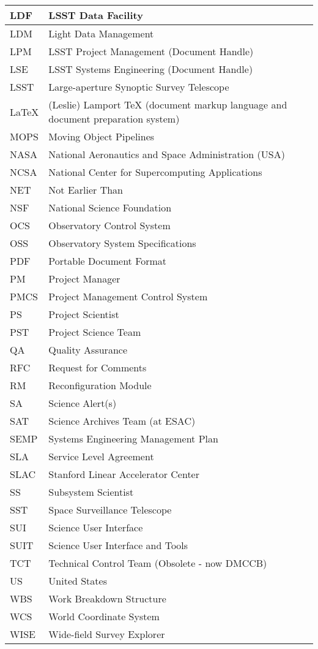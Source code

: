 \begin{longtable}{|l|p{}|}
LDF&LSST Data Facility \\\hline
LDM&Light Data Management \\\hline
LPM&LSST Project Management (Document Handle) \\\hline
LSE&LSST Systems Engineering (Document Handle) \\\hline
LSST&Large-aperture Synoptic Survey Telescope \\\hline
LaTeX&(Leslie) Lamport TeX (document markup language and document preparation system) \\\hline
MOPS&Moving Object Pipelines \\\hline
NASA&National Aeronautics and Space Administration (USA) \\\hline
NCSA&National Center for Supercomputing Applications \\\hline
NET&Not Earlier Than \\\hline
NSF&National Science Foundation \\\hline
OCS&Observatory Control System \\\hline
OSS&Observatory System Specifications \\\hline
PDF&Portable Document Format \\\hline
PM&Project Manager \\\hline
PMCS&Project Management Control System \\\hline
PS&Project Scientist \\\hline
PST&Project Science Team \\\hline
QA&Quality Assurance \\\hline
RFC&Request for Comments \\\hline
RM&Reconfiguration Module \\\hline
SA&Science Alert(s) \\\hline
SAT&Science Archives Team (at ESAC) \\\hline
SEMP&Systems Engineering Management Plan \\\hline
SLA&Service Level Agreement \\\hline
SLAC&Stanford Linear Accelerator Center \\\hline
SS&Subsystem Scientist \\\hline
SST&Space Surveillance Telescope \\\hline
SUI&Science User Interface \\\hline
SUIT&Science User Interface and Tools \\\hline
TCT&Technical Control Team (Obsolete - now DMCCB) \\\hline
US&United States \\\hline
WBS&Work Breakdown Structure \\\hline
WCS&World Coordinate System \\\hline
WISE&Wide-field Survey Explorer \\\hline
\end{longtable}

